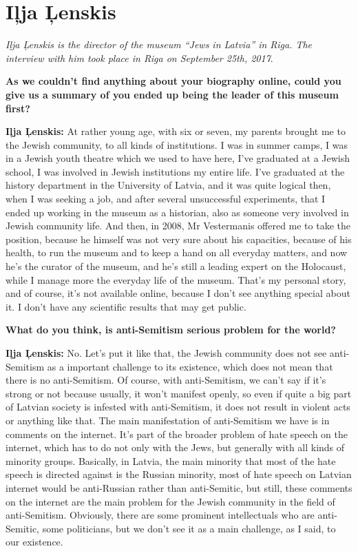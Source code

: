 \section{Iļja Ļenskis}

\textit{Iļja Ļenskis is the director of the museum ``Jews in Latvia'' in Riga. The interview with him took place in Riga on September 25th, 2017}.\par
\vspace*{2em}
\textbf{As we couldn’t find anything about your biography online, could you give us a summary of you ended up being the leader of this museum first?}

\textbf{Iļja Ļenskis:} At rather young age, with six or seven, my parents brought me to the Jewish community, to all kinds of institutions. I was in summer camps, I was in a Jewish youth theatre which we used to have here, I’ve graduated at a Jewish school, I was involved in Jewish institutions my entire life. I’ve graduated at the history department in the University of Latvia, and it was quite logical then, when I was seeking a job, and after several unsuccessful experiments, that I ended up working in the museum as a historian, also as someone very involved in Jewish community life. And then, in 2008, Mr Vestermanis offered me to take the position, because he himself was not very sure about his capacities, because of his health, to run the museum and to keep a hand on all everyday matters, and now he’s the curator of the museum, and he’s still a leading expert on the Holocaust, while I manage more the everyday life of the museum. That’s my personal story, and of course, it’s not available online, because I don’t see anything special about it. I don’t have any scientific results that may get public. 

\textbf{What do you think, is anti-Semitism serious problem for the world?}

\textbf{Iļja Ļenskis:} No. Let’s put it like that, the Jewish community does not see anti-Semitism as a important challenge to its existence, which does not mean that there is no anti-Semitism. Of course, with anti-Semitism, we can’t say if it’s strong or not because usually, it won’t manifest openly, so even if quite a big part of Latvian society is infested with anti-Semitism, it does not result in violent acts or anything like that. The main manifestation of anti-Semitism we have is in comments on the internet. It’s part of the broader problem of hate speech on the internet, which has to do not only with the Jews, but generally with all kinds of minority groups. Basically, in Latvia, the main minority that most of the hate speech is directed against is the Russian minority, most of hate speech on Latvian internet would be anti-Russian rather than anti-Semitic, but still, these comments on the internet are the main problem for the Jewish community in the field of anti-Semitism. Obviously, there are some prominent intellectuals who are anti-Semitic, some politicians, but we don’t see it as a main challenge, as I said, to our existence. 

